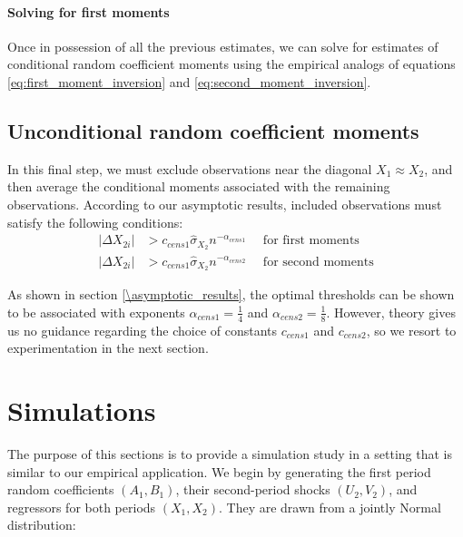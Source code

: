 \paragraph{Solving for first moments} Once in possession of all the previous estimates, we can solve for estimates of conditional random coefficient moments using the empirical analogs of equations \ref{eq:first_moment_inversion} and \ref{eq:second_moment_inversion}.
  

\subsection*{Unconditional random coefficient moments}

In this final step, we must exclude observations near the diagonal $X_1 ≈ X_2$, and then average the conditional moments associated with the remaining observations. According to our asymptotic results, included observations must satisfy the following conditions:
\begin{align}
  |\Delta X_{2i}| &> c_{cens1} \hat{\sigma}_{X_2} n^{-\alpha_{cens1}} \quad \text{ for first moments}\\
  |\Delta X_{2i}| &> c_{cens1} \hat{\sigma}_{X_2} n^{-\alpha_{cens2}} \quad \text{ for second moments}
\end{align}
  
As shown in section \ref{\asymptotic_results}, the optimal thresholds can be shown to be associated with exponents $\alpha_{cens1} = \frac{1}{4}$ and $\alpha_{cens2} = \frac{1}{8}$. However, theory gives us no guidance regarding the choice of constants $c_{cens1}$ and $c_{cens2}$, so we resort to experimentation in the next section.






\section{Simulations} \label{sec:simulation}

The purpose of this sections is to provide a simulation study in a setting that is similar to our empirical application. We begin by generating the first period random coefficients $(A_1, B_1)$, their second-period shocks $(U_2, V_2)$,
and regressors for both periods $(X_1, X_2)$. They are drawn from a jointly Normal distribution:

